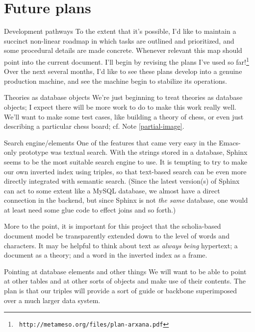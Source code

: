\section{Future plans}

\begin{notate}{Development pathways}
To the extent that it's possible, I'd like to maintain a
succinct non-linear roadmap in which tasks are outlined
and prioritized, and some procedural details are made
concrete.  Whenever relevant this map should point into
the current document.  I'll begin by revising the plans
I've used so far!\footnote{{\tt
    http://metameso.org/files/plan-arxana.pdf}} Over the
next several months, I'd like to see these plans develop
into a genuine production machine, and see the machine
begin to stabilize its operations.
\end{notate}

\begin{notate}{Theories as database objects} \label{theories-as-database-objects}
We're just beginning to treat theories as database
objects; I expect there will be more work to do to make
this work really well.  We'll want to make some test
cases, like building a theory of chess, or even just
describing a particular chess board; cf. Note
\ref{partial-image}.
\end{notate}

\begin{notate}{Search engine/elements} \label{search-engine}
One of the features that came very easy in the Emacs-only
prototype was textual search.  With the strings stored in
a database, Sphinx seems to be the most suitable search
engine to use.  It is tempting to try to make our own
inverted index using triples, so that text-based search
can be even more directly integrated with semantic search.
(Since the latest version(s) of Sphinx can act to some
extent like a MySQL database, we almost have a direct
connection in the backend, but since Sphinx is not
\emph{the same} database, one would at least need some
glue code to effect joins and so forth.)

More to the point, it is important for this project that
the scholia-based document model be transparently extended
down to the level of words and characters.  It may be
helpful to think about text as \emph{always being}
hypertext; a document as a theory; and a word in the
inverted index as a frame.
\end{notate}

\begin{notate}{Pointing at database elements and other things} \label{pointing}
We will want to be able to point at other tables and at
other sorts of objects and make use of their contents.
The plan is that our triples will provide a sort of guide
or backbone superimposed over a much larger data system.
\end{notate}

